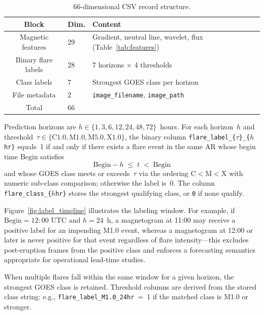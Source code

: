 \documentclass[]{spie}
\begin{document}
\begin{table}[t]
\caption{66-dimensional CSV record structure.}
\label{tab:schema}
\centering
\small
\begin{tabular}{@{}clp{5.0cm}@{}}
\toprule
Block & Dim. & Content \\
\midrule
Magnetic features & 29 & Gradient, neutral line, wavelet, flux (Table~\ref{tab:features}) \\
Binary flare labels & 28 & 7 horizons $\times$ 4 thresholds \\
Class labels & 7 & Strongest GOES class per horizon \\
File metadata & 2 & \texttt{image\_filename}, \texttt{image\_path} \\
\midrule
Total & 66 & \\
\bottomrule
\end{tabular}
\end{table}

Prediction horizons are $h \in \{1,3,6,12,24,48,72\}$~hours. For each horizon~$h$ and threshold~$\tau \in \{\mathrm{C1.0,M1.0,M5.0,X1.0}\}$, the binary column \texttt{flare\_label\_\{$\tau$\}\_\{$h$hr\}} equals~1 if and only if there exists a flare event in the same AR whose begin time $\mathrm{Begin}$ satisfies
\begin{equation}
\mathrm{Begin} - h \;\le\; t \;<\; \mathrm{Begin}
\label{eq:window}
\end{equation}
and whose GOES class meets or exceeds~$\tau$ via the ordering C$<$M$<$X with numeric sub-class comparison; otherwise the label is~0. The column \texttt{flare\_class\_\{$h$hr\}} stores the strongest qualifying class, or \texttt{0} if none qualify.



Figure~\ref{fig:label_timeline} illustrates the labeling window. For example, if $\mathrm{Begin = 12{:}00}$ UTC and $h = 24$~h, a magnetogram at 11:00 may receive a positive label for an impending M1.0 event, whereas a magnetogram at 12:00 or later is never positive for that event regardless of flare intensity---this excludes post-eruption frames from the positive class and enforces a forecasting semantics appropriate for operational lead-time studies.

When multiple flares fall within the same window for a given horizon, the strongest GOES class is retained. Threshold columns are derived from the stored class string: e.g., \texttt{flare\_label\_M1.0\_24hr}~=~1 if the matched class is M1.0 or stronger.
\end{document}
